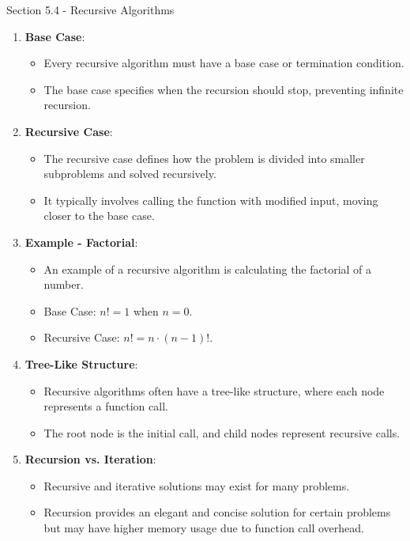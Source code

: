 \begin{notes}{Section 5.4 - Recursive Algorithms}
\begin{enumerate}
        \item \textbf{Base Case}:
        \begin{itemize}
            \item Every recursive algorithm must have a base case or termination condition.
            \item The base case specifies when the recursion should stop, preventing infinite recursion.
        \end{itemize}
        
        \item \textbf{Recursive Case}:
        \begin{itemize}
            \item The recursive case defines how the problem is divided into smaller subproblems and solved recursively.
            \item It typically involves calling the function with modified input, moving closer to the base case.
        \end{itemize}
        
        \item \textbf{Example - Factorial}:
        \begin{itemize}
            \item An example of a recursive algorithm is calculating the factorial of a number.
            \item Base Case: $n! = 1$ when $n = 0$.
            \item Recursive Case: $n! = n \cdot (n-1)!$.
        \end{itemize}
        
        \item \textbf{Tree-Like Structure}:
        \begin{itemize}
            \item Recursive algorithms often have a tree-like structure, where each node represents a function call.
            \item The root node is the initial call, and child nodes represent recursive calls.
        \end{itemize}
        
        \item \textbf{Recursion vs. Iteration}:
        \begin{itemize}
            \item Recursive and iterative solutions may exist for many problems.
            \item Recursion provides an elegant and concise solution for certain problems but may have higher memory usage due to function call overhead.
        \end{itemize}
        

\end{enumerate}
\end{notes}

